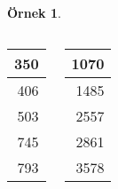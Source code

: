 \documentclass[dvipsnames]{beamer}
\theoremstyle{definition}
\theoremstyle{example}
\newtheorem{ornek}[theorem]{Örnek}
\theoremstyle{plain}
\begin{document}
\begin{frame}[fragile]
\begin{ornek}
\begin{columns}[b]
      \begin{tiny}
      \begin{table}
        \begin{tabular}{|r|}\hline
                350\\\hline
                406\\\hline
                503\\\hline
                745\\\hline
                793\\\hline
        \end{tabular}
      \end{table}
      \end{tiny}

      \begin{tiny}
      \begin{table}
        \begin{tabular}{|r|}\hline
               1070\\\hline
               1485\\\hline
               2557\\\hline
               2861\\\hline
               3578\\\hline
        \end{tabular}
      \end{table}
      \end{tiny}
    \end{columns}
  \end{ornek}
\end{frame}
\end{document}
